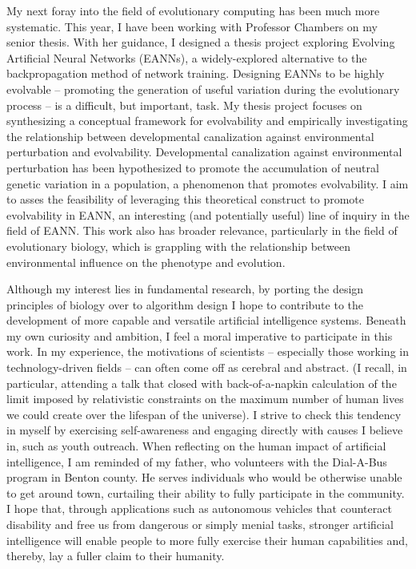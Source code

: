 \documentclass[12pt]{book}
\begin{document}
My next foray into the field of evolutionary computing has been much more systematic. This year, I have been working with Professor Chambers on my senior thesis. With her guidance, I designed a thesis project exploring Evolving Artificial Neural Networks (EANNs), a widely-explored alternative to the backpropagation method of network training. Designing EANNs to be highly evolvable  --  promoting the generation of useful variation during the evolutionary process  --  is a difficult, but important, task. My thesis project focuses on synthesizing a conceptual framework for evolvability and empirically investigating the relationship between developmental canalization against environmental perturbation and evolvability. Developmental canalization against environmental perturbation has been hypothesized to promote the accumulation of neutral genetic variation in a population, a phenomenon that promotes evolvability. I aim to asses the feasibility of leveraging this theoretical construct to promote evolvability in EANN, an interesting (and potentially useful) line of inquiry in the field of EANN. This work also has broader relevance, particularly in the field of evolutionary biology, which is grappling with the relationship between environmental influence on the phenotype and evolution. 

Although my interest lies in fundamental research, by porting the design principles of biology over to algorithm design I hope to contribute to the development of more capable and versatile artificial intelligence systems. Beneath my own curiosity and ambition, I feel a moral imperative to participate in this work. In my experience, the motivations of scientists -- especially those working in technology-driven fields -- can often come off as cerebral and abstract. (I recall, in particular, attending a talk that closed with back-of-a-napkin calculation of the limit imposed by relativistic constraints on the maximum number of human lives we could create over the lifespan of the universe). I strive to check this tendency in myself by exercising self-awareness and engaging directly with causes I believe in, such as youth outreach. When reflecting on the human impact of artificial intelligence, I am reminded of my father, who volunteers with the Dial-A-Bus program in Benton county. He serves individuals who would be otherwise unable to get around town, curtailing their ability to fully participate in the community. I hope that, through applications such as autonomous vehicles that counteract disability and free us from dangerous or simply menial tasks, stronger artificial intelligence will enable people to more fully exercise their human capabilities and, thereby, lay a fuller claim to their humanity.
\end{document}
